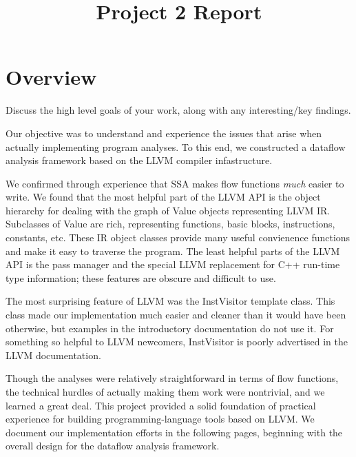 \documentclass{article}
\title{Project 2 Report}
\theoremstyle{definition}
\begin{document}
\maketitle

\section{Overview}
\begin{framed}
  Discuss the high level goals of your work, along with any
  interesting/key findings.
\end{framed}

Our objective was to understand and experience the issues that arise
when actually implementing program analyses. To this end, we
constructed a dataflow analysis framework based on the LLVM compiler
infastructure.

We confirmed through experience that SSA makes flow functions
\emph{much} easier to write. We found that the most helpful part of
the LLVM API is the object hierarchy for dealing with the graph of
Value objects representing LLVM IR. Subclasses of Value are rich,
representing functions, basic blocks, instructions, constants,
etc. These IR object classes provide many useful convienence functions
and make it easy to traverse the program. The least helpful parts of
the LLVM API is the pass manager and the special LLVM replacement for
C++ run-time type information; these features are obscure and
difficult to use.

The most surprising feature of LLVM was the InstVisitor template
class. This class made our implementation much easier and cleaner than
it would have been otherwise, but examples in the introductory
documentation do not use it. For something so helpful to LLVM
newcomers, InstVisitor is poorly advertised in the LLVM documentation.

Though the analyses were relatively straightforward in terms of flow
functions, the technical hurdles of actually making them work were
nontrivial, and we learned a great deal. This project provided a solid
foundation of practical experience for building programming-language
tools based on LLVM. We document our implementation efforts in the
following pages, beginning with the overall design for the dataflow
analysis framework. 

\end{document}
